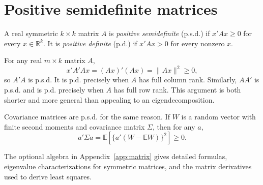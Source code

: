 \section{Positive semidefinite matrices}

\begin{definition}
A real symmetric $k\times k$ matrix $A$ is \emph{positive semidefinite}
(p.s.d.) if $x'Ax\geq0$ for every $x\in\mathbb R^k$.  It is \emph{positive
definite} (p.d.) if $x'Ax>0$ for every nonzero $x$.
\end{definition}

For any real $m\times k$ matrix $A$,
\[
  x'A'Ax=(Ax)'(Ax)=\lVert Ax\rVert^2\geq0,
\]
so $A'A$ is p.s.d.  It is p.d. precisely when $A$ has full column rank.
Similarly, $AA'$ is p.s.d. and is p.d. precisely when $A$ has full row rank.
This argument is both shorter and more general than appealing to an
eigendecomposition.

Covariance matrices are p.s.d. for the same reason.  If $W$ is a random
vector with finite second moments and covariance matrix $\Sigma$, then for
any $a$,
\[
  a'\Sigma a
  =\mathbb E\!\left[\{a'(W-\mathbb EW)\}^2\right]\geq0.
\]

The optional algebra in Appendix~\ref{app:matrix} gives detailed formulas,
eigenvalue characterizations for symmetric matrices, and the matrix
derivatives used to derive least squares.
